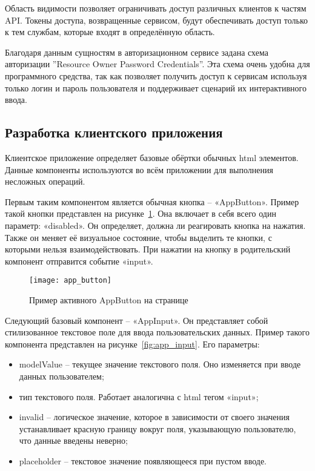 Область видимости позволяет ограничивать доступ различных клиентов к частям API. Токены доступа, возвращенные сервисом, будут обеспечивать доступ только к тем службам, которые входят в определённую область.

Благодаря данным сущностям в авторизационном сервисе задана схема авторизации ''Resource Owner Password Credentials''. Эта схема очень удобна для программного средства, так как позволяет получить доступ к сервисам используя только логин и пароль пользователя и поддерживает сценарий их интерактивного ввода.

\subsection{Разработка клиентского приложения}\label{sec:development:client_app}

Клиентское приложение определяет базовые обёртки обычных html элементов. Данные компоненты используются во всём приложении для выполнения несложных операций.

Первым таким компонентом является обычная кнопка – «AppButton». Пример такой кнопки представлен на рисунке~\ref{fig:app_button}. Она включает в себя всего один параметр: «disabled». Он определяет, должна ли реагировать кнопка на нажатия. Также он меняет её визуальное состояние, чтобы выделить те кнопки, с которыми нельзя взаимодействовать. При нажатии на кнопку в родительский компонент отправится событие «input».

\begin{figure}[h]
    \centering
    \texttt{[image: app\_button]}
    \caption{Пример активного AppButton на странице}\label{fig:app_button}
\end{figure}

Следующий базовый компонент – «AppInput». Он представляет собой стилизованное текстовое поле для ввода пользовательских данных. Пример такого компонента представлен на рисунке~\ref{fig:app_input}. Его параметры:

\begin{itemize}
    \item modelValue – текущее значение текстового поля. Оно изменяется при вводе данных пользователем;
    \item тип текстового поля. Работает аналогична с html тегом «input»;
    \item invalid – логическое значение, которое в зависимости от своего значения устанавливает красную границу вокруг поля, указывающую пользователю, что данные введены неверно;
    \item placeholder – текстовое значение появляющееся при пустом вводе.
\end{itemize}

